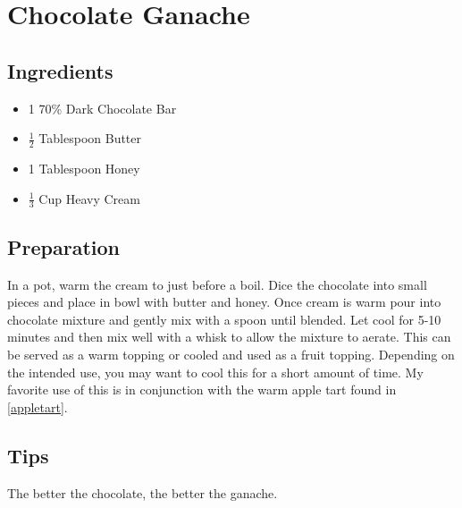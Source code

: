 \thispagestyle{fancy}
\section{Chocolate Ganache} \label{ganache}
\AddToShipoutPicture*{\Strawberries}

\subsection*{Ingredients}
\begin{multicols}{3}
	\begin{itemize}
		\item 1 70\% Dark Chocolate Bar
		\item $\frac{1}{2}$ Tablespoon Butter
		\item 1 Tablespoon Honey
		\item $\frac{1}{3}$ Cup Heavy Cream
	\end{itemize}
\end{multicols}

\subsection*{Preparation}

In a pot, warm the cream to just before a boil. Dice the chocolate into small pieces and place in bowl with butter and honey. Once cream is warm pour into chocolate mixture and gently mix with a spoon until blended. Let cool for 5-10 minutes and then mix well with a whisk to allow the mixture to aerate. This can be served as a warm topping or cooled and used as a fruit topping. Depending on the intended use, you may want to cool this for a short amount of time. My favorite use of this is in conjunction with the warm apple tart found in \ref{appletart}.

\subsection*{Tips}

The better the chocolate, the better the ganache.